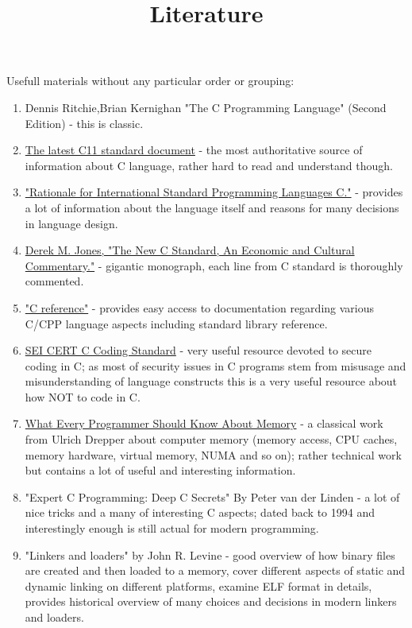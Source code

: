 \documentclass{article}
\begin{document}
\title{Literature}
{\Large Usefull materials without any particular order or grouping:}
\begin{enumerate}
\item Dennis Ritchie,Brian Kernighan "The C Programming Language" (Second Edition) - this is classic.
\item \href{http://www.open-std.org/jtc1/sc22/wg14/www/docs/n1548.pdf}{The latest C11 standard document} - the most authoritative source of information about C language, rather hard to read and understand though.
\item \href{http://www.open-std.org/jtc1/sc22/wg14/www/C99RationaleV5.10.pdf}{"Rationale for International Standard Programming Languages C."} - provides a lot of information about the language itself and reasons for many decisions in language design.
\item \href{http://people.ece.cornell.edu/land/courses/ece4760/cbook1_1.pdf}{Derek M. Jones, "The New C Standard, An Economic and Cultural Commentary."} - gigantic monograph, each line from C standard is thoroughly commented.
\item \href{http://en.cppreference.com/w/c}{"C reference"} - provides easy access to documentation regarding various C/CPP language aspects including standard library reference.
\item \href{https://www.securecoding.cert.org/confluence/display/c/SEI+CERT+C+Coding+Standard}{SEI CERT C Coding Standard} - very useful resource devoted to secure coding in C; as most of security issues in C programs stem from misusage and misunderstanding of language constructs this is a very useful resource about how NOT to code in C.
\item \href{https://www.akkadia.org/drepper/cpumemory.pdf}{What Every Programmer Should Know About Memory} - a classical work from Ulrich Drepper about computer memory (memory access, CPU caches, memory hardware, virtual memory, NUMA and so on); rather technical work but contains a lot of useful and interesting information.
\item "Expert C Programming: Deep C Secrets" By Peter van der Linden - a lot of nice tricks and a many of interesting C aspects; dated back to 1994 and interestingly enough is still actual for modern programming.
\item "Linkers and loaders" by John R. Levine - good overview of how binary files are created and then loaded to a memory, cover different aspects of static and dynamic linking on different platforms, examine ELF format in details, provides historical overview of many choices and decisions in modern linkers and loaders.

\end{enumerate}
\end{document}
